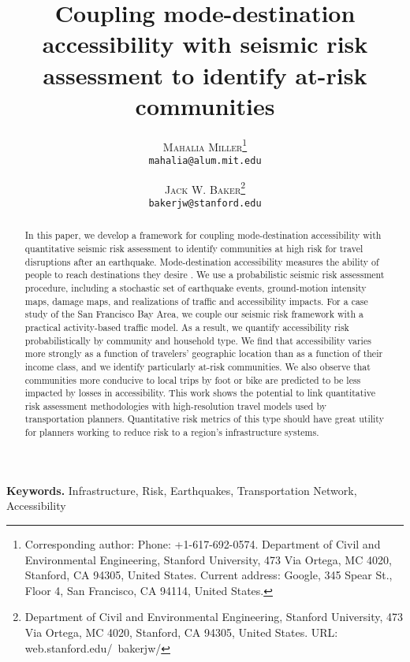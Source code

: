 \documentclass[twoside]{article}
\title{\vspace{-15mm}\fontsize{24pt}{10pt}\selectfont\textbf{Coupling mode-destination accessibility with seismic risk assessment to identify at-risk communities}} %
\author{
 \textsc{Mahalia Miller}\thanks{Corresponding author: Phone: +1-617-692-0574. Department of Civil and Environmental Engineering, Stanford University, 473 Via Ortega, MC 4020, Stanford, CA 94305, United States. Current address: Google, 345 Spear St., Floor 4, San Francisco, CA 94114, United States.}\\
  \texttt{mahalia@alum.mit.edu}
  \and
 \textsc{Jack W. Baker}\thanks{Department of Civil and Environmental Engineering, Stanford University, 473 Via Ortega, MC 4020, Stanford, CA 94305, United States. URL:  web.stanford.edu/~bakerjw/}\\
  \texttt{bakerjw@stanford.edu}
}
\date{}
\newcounter{ead}
\begin{document}
\maketitle %

\thispagestyle{fancy} %


\begin{abstract}
In this paper, we develop a framework for coupling mode-destination accessibility with quantitative seismic risk assessment to identify communities at high risk for travel disruptions after an earthquake. Mode-destination accessibility measures the ability of people to reach destinations they desire%
. We use a probabilistic seismic risk assessment procedure, including a stochastic set of earthquake events, ground-motion intensity maps, damage maps, and realizations of traffic and accessibility impacts. For a case study of the San Francisco Bay Area, we couple our seismic risk framework with a practical activity-based traffic model. As a result, we quantify accessibility risk probabilistically by community and household type. We find that accessibility varies more strongly as a function of travelers' geographic location than as a function of their income class, and we identify particularly at-risk communities.  We also observe that communities more conducive to local trips by foot or bike are predicted to be less impacted by losses in accessibility. This work shows the potential to link quantitative risk assessment methodologies with high-resolution travel models used by transportation planners. Quantitative risk metrics of this type should have great utility for planners working to reduce risk to a region's infrastructure systems.

\end{abstract}
\smallskip
\noindent \textbf{Keywords.} Infrastructure, Risk, Earthquakes, Transportation Network, Accessibility
\end{document}
